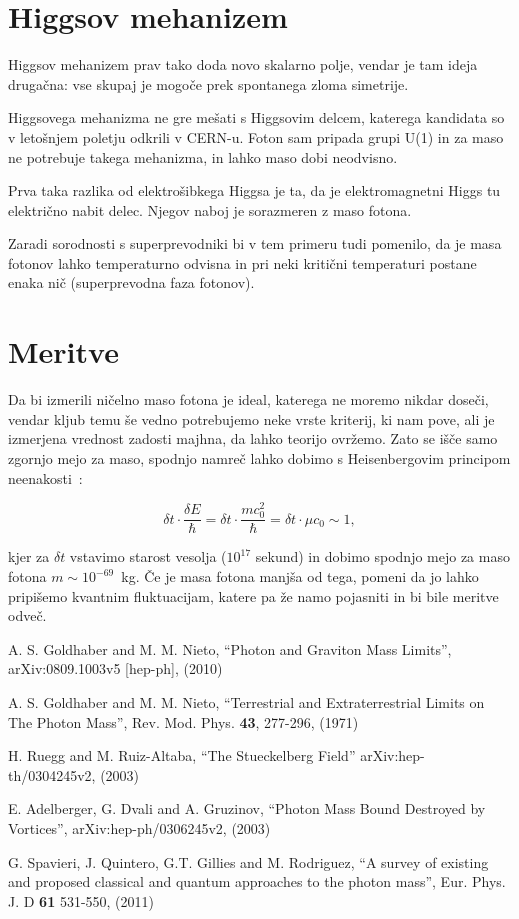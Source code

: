 \documentclass[a4paper, twocolumn, titlepage]{article}
\begin{document}
\section{Higgsov mehanizem}

Higgsov mehanizem prav tako doda novo skalarno polje, vendar je tam ideja druga\v cna: vse skupaj je mogo\v ce prek
spontanega zloma simetrije.

Higgsovega mehanizma ne gre me\v sati s Higgsovim delcem, katerega kandidata so v leto\v snjem poletju odkrili v CERN-u.
Foton sam pripada grupi U(1) in za maso ne potrebuje takega mehanizma, in lahko maso dobi neodvisno.

Prva taka razlika od elektro\v sibkega Higgsa je ta, da je elektromagnetni Higgs tu elektri\v cno nabit delec. Njegov
naboj je sorazmeren z maso fotona.

Zaradi sorodnosti s superprevodniki bi v tem primeru tudi pomenilo, da je masa fotonov lahko temperaturno odvisna in pri
neki kriti\v cni temperaturi postane enaka ni\v c (superprevodna faza fotonov).

\section{Meritve}

Da bi izmerili ni\v celno maso fotona je ideal, katerega ne moremo nikdar dose\v ci, vendar kljub temu \v se vedno
potrebujemo neke vrste kriterij, ki nam pove, ali je izmerjena vrednost zadosti majhna, da lahko teorijo ovr\v zemo.
Zato se i\v s\v ce samo zgornjo mejo za maso, spodnjo namre\v c lahko dobimo s Heisenbergovim principom
neenakosti~\cite{over}:

\begin{equation}
	\delta t \cdot \frac{\delta E}{\hbar} = \delta t \cdot \frac{mc_0^2}{\hbar} = \delta t \cdot \mu c_0 \sim 1,
\end{equation}

kjer za $\delta t$ vstavimo starost vesolja ($10^{17}$ sekund) in dobimo spodnjo mejo za maso fotona \hbox{$m \sim
10^{-69}$ kg}.
\v Ce je masa fotona manj\v sa od tega, pomeni da jo lahko pripi\v semo kvantnim fluktuacijam, katere pa \v ze namo
pojasniti in bi bile meritve odve\v c.

\begin{thebibliography}{9}
	A. S. Goldhaber and M. M. Nieto,
	"`Photon and Graviton Mass Limits"',
	arXiv:0809.1003v5 [hep-ph],
	(2010)

	A. S. Goldhaber and M. M. Nieto,
	"`Terrestrial and Extraterrestrial Limits on The Photon Mass"',
	Rev. Mod. Phys. {\bf 43}, 277-296,
	(1971)

	H. Ruegg and M. Ruiz-Altaba,
	"`The Stueckelberg Field"'
	arXiv:hep-th/0304245v2,
	(2003)

	E. Adelberger, G. Dvali and A. Gruzinov,
	"`Photon Mass Bound Destroyed by Vortices"',
	arXiv:hep-ph/0306245v2,
	(2003)

	G. Spavieri, J. Quintero, G.T. Gillies and M. Rodriguez,
	"`A survey of existing and proposed classical and quantum approaches to the photon mass"',
	Eur. Phys. J. D {\bf 61} 531-550,
	(2011)
\end{thebibliography}
\end{document}
